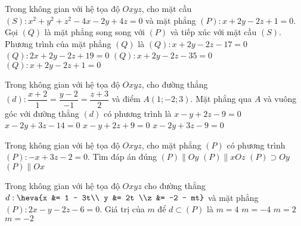 	\begin{ex}%
	Trong không gian với hệ tọa độ $Oxyz$, cho mặt cầu $(S)\colon x^2+y^2+z^2-4x-2y+4z=0$ và mặt phẳng $(P)\colon x+2y-2z+1=0$. Gọi $(Q)$ là mặt phẳng song song với $(P)$ và tiếp xúc với mặt cầu $(S)$. Phương trình của mặt phẳng $(Q)$ là
	\choice
	{\True $(Q): x+2y-2z-17=0 $}
	{$(Q): 2x+2y-2z+19=0 $}
	{$(Q): x+2y-2z-35=0 $}
	{ $(Q): x+2y-2z+1=0 $}
	\end{ex}
	\begin{ex}%
	Trong không gian với hệ tọa độ $Oxyz$, cho đường thẳng $(d)\colon \dfrac{x+2}{1}=\dfrac{y-2}{-1}=\dfrac{z+3}{2}$ và điểm $A(1;-2;3)$. Mặt phẳng qua $A$ và vuông góc với đường thẳng $(d)$ có phương trình là
	\choice
	{\True $x-y+2z-9=0$}
	{$x-2y+3z-14=0$}
	{$x-y+2z+9=0$}
	{$x-2y+3z-9=0$}
	\end{ex}
	\begin{ex}%
	Trong không gian với hệ tọa độ $Oxyz$, cho mặt phẳng $(P)$ có phương trình $(P): -x + 3z - 2 = 0$. Tìm đáp án đúng 
	\choice
	{\True $(P) \parallel Oy$}
	{$(P) \parallel xOz$}
	{$(P) \supset Oy$}
	{$(P) \parallel Ox$}
	\end{ex}
	\begin{ex}%
	Trong không gian với hệ tọa độ $Oxyz$ cho đường thẳng $d: \heva{x &= 1 - 3t\\ y &= 2t \\z &= -2 - mt}$ và mặt phẳng $(P): 2x - y - 2z - 6 = 0$. Giá trị của $m$ để $d \subset (P)$ là 
	\choice
	{\True $m = 4$}
	{$m = -4$}
	{$m = 2$}
	{$m = -2$}
	\end{ex}
